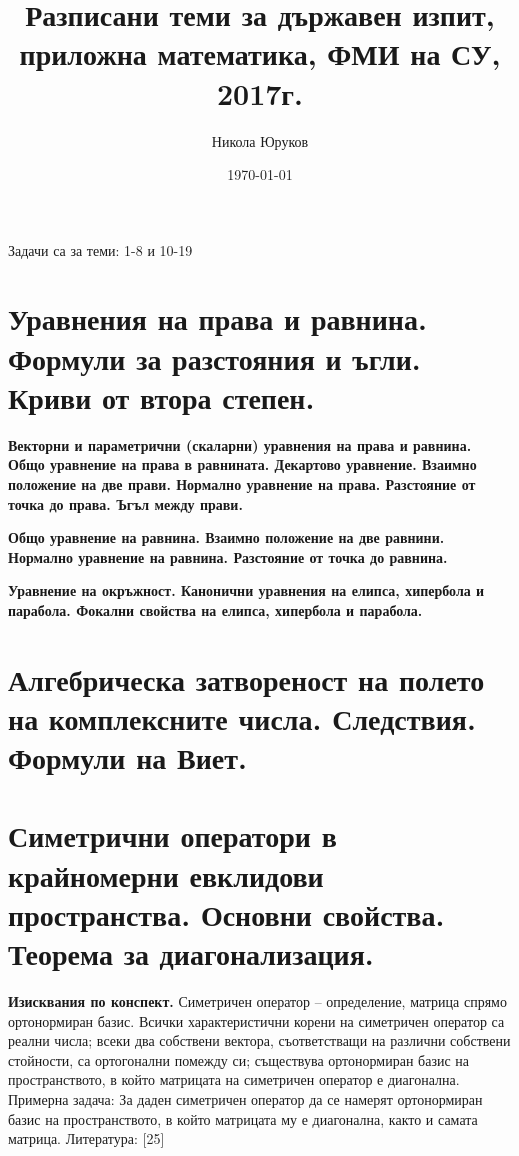 \documentclass[11pt]{article}
\title{Разписани теми за държавен изпит, приложна математика, ФМИ на СУ, 2017г.}
\author{Никола Юруков}
\date{\today}
\numberwithin{equation}{section}
\numberwithin{figure}{section}
\numberwithin{table}{section}
\theoremstyle{plain}
\theoremstyle{definition}
\theoremstyle{remark}
\theoremstyle{definition}
\theoremstyle{remark}
\theoremstyle{plain}
\theoremstyle{definition}
\theoremstyle{definition}
\theoremstyle{plain}
\theoremstyle{plain}
\theoremstyle{plain}
\theoremstyle{definition}
\theoremstyle{plain}
\begin{document}
\maketitle

\clearpage

\tableofcontents

\clearpage

Задачи са за теми: 1-8 и 10-19

\section{Уравнения на права и равнина. Формули за разстояния и ъгли. Криви от втора степен.}

\textbf{Векторни и параметрични (скаларни) уравнения на права и равнина. Общо уравнение на права в равнината. Декартово уравнение. Взаимно положение на две прави. Нормално уравнение на права. Разстояние от точка до права. Ъгъл между прави.}

\textbf{Общо уравнение на равнина. Взаимно положение на две равнини. Нормално уравнение на равнина. Разстояние от точка до равнина.}

\textbf{Уравнение на окръжност. Канонични уравнения на елипса, хипербола и парабола. Фокални свойства на елипса, хипербола и парабола.}

\section{Алгебрическа затвореност на полето на комплексните числа. Следствия. Формули на Виет.}

\section{Симетрични оператори в крайномерни евклидови пространства. Основни свойства. Теорема за
диагонализация.}

\hrulefill

\textbf{Изисквания по конспект.} Симетричен оператор – определение, матрица спрямо ортонормиран базис. Всички характеристични
корени на симетричен оператор са реални числа; всеки два собствени вектора, съответстващи на различни
собствени стойности, са ортогонални помежду си; съществува ортонормиран базис на пространството, в който
матрицата на симетричен оператор е диагонална.
Примерна задача: За даден симетричен оператор да се намерят ортонормиран базис на пространството,
в който матрицата му е диагонална, както и самата матрица.
Литература: [25]
\end{document}
